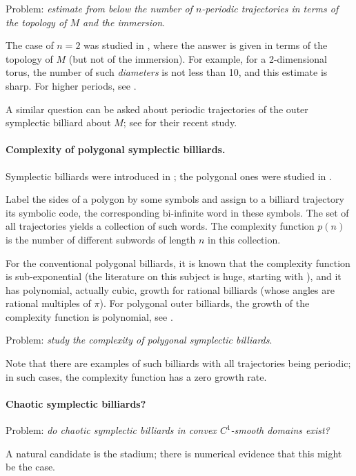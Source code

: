 \documentclass[11pt]{article}
\theoremstyle{definition}
\begin{document}
Problem: {\it estimate from below the number of $n$-periodic trajectories in terms of the topology of $M$ and the immersion}. 

The case of $n=2$ was studied in \cite{Pu}, where the answer is given in terms of the topology of $M$ (but not of the immersion). For example, for a 2-dimensional torus, the number of such {\it diameters} is not less than 10, and this estimate is sharp. For higher periods, see \cite{Du1,Du2}.

A similar question can be asked about periodic trajectories of the outer symplectic billiard about $M$; see \cite{ACT} for their recent study.

\paragraph{Complexity of polygonal symplectic billiards.} Symplectic billiards were introduced in \cite{AT}; the polygonal ones were studied in \cite{ABSST,ALW}. 

Label the sides of a polygon by some symbols and assign to a billiard trajectory its symbolic code, the corresponding bi-infinite word in these symbols. The set of all trajectories yields a collection of such words. The complexity function $p(n)$ is the number of different subwords of length $n$ in this collection. 

For the conventional polygonal billiards, it is known that the complexity function is sub-exponential (the literature on this subject is huge, starting with \cite{Ka}), and it has polynomial, actually cubic, growth for rational billiards (whose angles are rational multiples of $\pi$). For polygonal outer billiards, the growth of the complexity function is polynomial, see \cite{GT}.

Problem: {\it study the complexity of polygonal symplectic billiards}. 

Note that there are examples of such billiards with all trajectories being periodic; in such cases, the complexity function has a zero growth rate.

\paragraph{Chaotic symplectic billiards?} Problem: {\it do chaotic symplectic billiards in convex $C^1$-smooth domains exist?}

A natural candidate is the stadium; there is numerical evidence that this might be the case.
\end{document}
